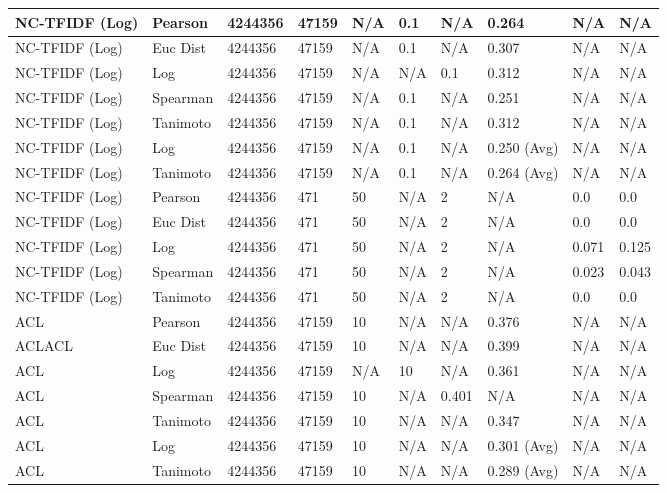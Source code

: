 \documentclass{article}
\begin{document}
\begin{longtable}{ |p{1.7cm}|p{1.9cm}|p{1.5cm}|p{1.5cm}|p{0.75cm}|p{0.75cm}|p{0.75cm}|p{0.75cm}|p{1.5cm}|p{1.5cm}|}
    NC-TFIDF (Log) & Pearson & 4244356 & 47159 & N/A & 0.1 & N/A & 0.264 & N/A & N/A  \\ \hline
    NC-TFIDF (Log) & Euc Dist & 4244356 & 47159 & N/A & 0.1 & N/A & 0.307 & N/A & N/A   \\ \hline
    NC-TFIDF (Log) & Log & 4244356 & 47159 & N/A &  N/A & 0.1 & 0.312 & N/A & N/A  \\ \hline
    NC-TFIDF (Log)   & Spearman & 4244356 & 47159 & N/A & 0.1 & N/A & 0.251 & N/A & N/A \\ \hline
    NC-TFIDF (Log)   & Tanimoto & 4244356 & 47159 & N/A & 0.1 & N/A & 0.312 & N/A & N/A \\ \hline
    NC-TFIDF (Log)  & Log & 4244356 & 47159 & N/A & 0.1 & N/A & 0.250 (Avg) & N/A & N/A \\ \hline
    NC-TFIDF (Log) & Tanimoto & 4244356 & 47159 & N/A & 0.1 & N/A & 0.264 (Avg) & N/A & N/A \\ \hline
    
    NC-TFIDF (Log)  & Pearson & 4244356 & 471 & 50 & N/A  & 2 & N/A & 0.0 & 0.0  \\ \hline
    NC-TFIDF (Log)  & Euc Dist & 4244356 & 471 & 50 & N/A  & 2 & N/A &0.0 & 0.0   \\ \hline
    NC-TFIDF (Log)  & Log & 4244356 & 471 & 50 & N/A & 2 & N/A & 0.071 & 0.125  \\ \hline
    NC-TFIDF (Log)  & Spearman & 4244356 & 471 & 50 & N/A  & 2 & N/A &0.023 & 0.043 \\ \hline
    NC-TFIDF (Log)  & Tanimoto & 4244356 & 471 & 50 & N/A  & 2 & N/A & 0.0 & 0.0 \\ \hline

    ACL & Pearson & 4244356 & 47159 & 10 & N/A & N/A & 0.376 & N/A & N/A  \\ \hline
    ACLACL & Euc Dist & 4244356 & 47159 & 10 & N/A & N/A & 0.399 & N/A & N/A   \\ \hline
    ACL & Log & 4244356 & 47159 & N/A &  10 & N/A& 0.361 & N/A & N/A  \\ \hline
    ACL & Spearman & 4244356 & 47159 & 10 & N/A & 0.401 & N/A & N/A & N/A \\ \hline
    ACL & Tanimoto & 4244356 & 47159 & 10 & N/A& N/A & 0.347 & N/A & N/A \\ \hline
    ACL & Log & 4244356 & 47159 & 10 & N/A& N/A & 0.301 (Avg) & N/A & N/A \\ \hline
    ACL & Tanimoto & 4244356 & 47159 & 10 & N/A & N/A & 0.289 (Avg) & N/A & N/A \\ \hline
    

\end{longtable}
\end{document}
